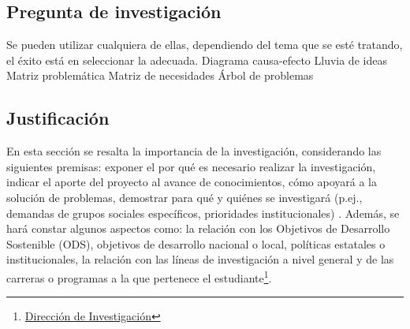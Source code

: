 \subsection{Pregunta de investigación}
Se pueden utilizar cualquiera de ellas, dependiendo del tema que se esté tratando, el éxito está en seleccionar la adecuada.
Diagrama causa-efecto
Lluvia de ideas
Matriz problemática
Matriz de necesidades
Árbol de problemas
\subsection{Justificación}
En esta sección se resalta la importancia de la investigación, considerando las siguientes premisas: exponer el por qué es necesario realizar la investigación, indicar el aporte del proyecto al avance de conocimientos, cómo apoyará a la solución de problemas, demostrar para qué y quiénes se investigará (p.ej., demandas de grupos sociales específicos, prioridades institucionales) . Además, se hará constar algunos aspectos como: la relación con los Objetivos de Desarrollo Sostenible (ODS), objetivos de desarrollo nacional o local, políticas estatales o institucionales, la relación con las líneas de investigación a nivel general y de las carreras o programas a la que pertenece el estudiante\footnote{\href{https://unl.edu.ec/investigacion}{Dirección de Investigación}}.